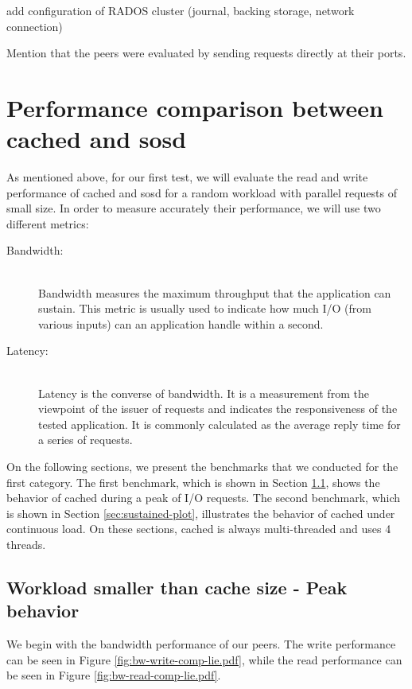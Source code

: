 \todo add configuration of RADOS cluster (journal, backing storage, network 
connection)

\fixme Mention that the peers were evaluated by sending requests directly at 
their ports.

\section{Performance comparison between cached and sosd}
\label{sec:vs-plot}

As mentioned above, for our first test, we will evaluate the read and write 
performance of cached and sosd for a random workload with parallel requests of 
small size. In order to measure accurately their performance, we will use two 
different metrics:

\begin{description}
	\item[Bandwidth:] \hfill \\
		Bandwidth measures the maximum throughput that the application 
		can sustain. This metric is usually used to indicate how much 
		I/O (from various inputs) can an application handle within a 
		second.
	\item[Latency:] \hfill \\
		Latency is the converse of bandwidth. It is a measurement from 
		the viewpoint of the issuer of requests and indicates the 
		responsiveness of the tested application. It is commonly 
		calculated as the average reply time for a series of requests.
\end{description}

On the following sections, we present the benchmarks that we conducted for the 
first category. The first benchmark, which is shown in Section 
\ref{sec:peak-plot}, shows the behavior of cached during a peak of I/O 
requests.  The second benchmark, which is shown in Section 
\ref{sec:sustained-plot}, illustrates the behavior of cached under continuous 
load.  On these sections, cached is always multi-threaded and uses 4 threads.

\subsection{Workload smaller than cache size - Peak behavior}
\label{sec:peak-plot}

We begin with the bandwidth performance of our peers. The write performance can 
be seen in Figure \ref{fig:bw-write-comp-lie.pdf}, while the read performance 
can be seen in Figure \ref{fig:bw-read-comp-lie.pdf}.

